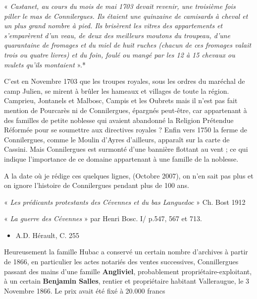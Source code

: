 \vspace{0.2cm}

« \textit{Castanet, au cours du mois de mai 1703 devait revenir, une troisième fois piller le mas de
Connilergues. Ils étaient une quinzaine de camisards à cheval et un plus grand nombre à
pied. Ils brisèrent les vitres des appartements et s’emparèrent d’un veau, de deux des
meilleurs moutons du troupeau, d’une quarantaine de fromages et du miel de huit ruches
(chacun de ces fromages valait trois ou quatre livres) et du foin, foulé ou mangé par les 12 à
15 chevaux ou mulets qu’ils montaient} ».*

\vspace{0.2cm}

C’est en Novembre 1703 que les troupes royales, sous les ordres du maréchal de camp Julien,
se mirent à brûler les hameaux et villages de toute la région. Camprieu, Jontanels et Malbosc,
Campis et les Oubrets mais il n’est pas fait mention de Pourcarès ni de Connilergues,
épargnés peut-être, car appartenant à des familles de petite noblesse qui avaient abandonné la
Religion Prétendue Réformée pour se soumettre aux directives royales ?
Enfin vers 1750 la ferme de Connilergues, comme le Moulin d’Ayres d’ailleurs, apparaît sur
la carte de Cassini. Mais Connilergues est surmonté d’une bannière flottant au vent ; ce qui
indique l’importance de ce domaine appartenant à une famille de la noblesse.

\vspace{0.2cm}

A la date où je rédige ces quelques lignes, (Octobre 2007), on n’en sait pas plus et on ignore
l’histoire de Connilergues pendant plus de 100 ans.

\vspace{0.2cm}

« \textit{Les prédicants protestants des Cévennes et du bas Languedoc} » Ch. Bost 1912

« \textit{La guerre des Cévennes} » par Henri Bosc. I/ p.547, 567 et 713.

\begin{itemize}
    \item A.D. Hérault, C. 255
\end{itemize}


Heureusement la famille Hubac a conservé un certain nombre d’archives à partir de 1866, en
particulier les actes notariés des ventes successives, Connillergues passant des mains d’une
famille \textbf{Angliviel}, probablement propriétaire-exploitant, à un certain \textbf{Benjamin Salles}, rentier
et propriétaire habitant Valleraugue, le 3 Novembre 1866. Le prix avait été fixé à 20.000
francs

